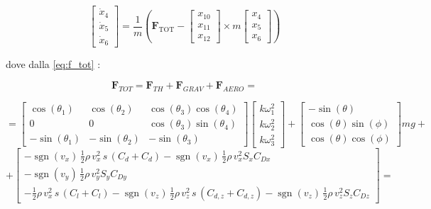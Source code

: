 \begin{equation}
\begin{bmatrix}
\dot{x}_4 \\ \dot{x}_5 \\ \dot{x}_6
\end{bmatrix}
=
\frac{1}{m}\left(
\bm{F}_{\text{TOT}} -
\begin{bmatrix}
x_{10} \\ x_{11} \\ x_{12}
\end{bmatrix}
\times
m
\begin{bmatrix}
x_4 \\ x_5 \\ x_6
\end{bmatrix}
\right)
\end{equation}



\vspace{0.5cm}

dove dalla \ref{eq:f_tot} :

\begin{equation*}
\bm{F}_{TOT} = \bm{F}_{TH} + \bm{F}_{GRAV} + \bm{F}_{AERO} = 
\end{equation*}

\begin{equation*}
=  
\begin{bmatrix}
	\cos(\theta_{1}) & \cos(\theta_{2}) & {\cos(\theta_{3})\cos(\theta_{4})} \\
	0                 & 0                 & {\cos(\theta_{3})\sin(\theta_{4})} \\
	-\sin(\theta_{1}) & -\sin(\theta_{2}) & {-\sin(\theta_{3})}
\end{bmatrix}
\begin{bmatrix}
	k\omega_{1}^2 \\
	k\omega_{2}^2 \\
	k\omega_{3}^2 
\end{bmatrix} +  \begin{bmatrix}
	-\sin(\theta) \\
	\cos(\theta)\sin(\phi) \\
	\cos(\theta)\cos(\phi) 
\end{bmatrix} m g +  
\end{equation*}
\begin{equation*}
+
\begin{bmatrix}
	  	-\operatorname{sgn}(v_x) \,\frac{1}{2}\rho\, v_x^2\, s\, (C_d + C_d) -\operatorname{sgn}(v_x) \,\frac{1}{2}\rho\, v_x^2 S_{x} C_{Dx} \\
	  	-\operatorname{sgn}(v_y)\,\frac{1}{2}\rho\, v_y^2 S_{y} C_{Dy} \\
	  	-\frac{1}{2}\rho\, v_x^2\, s\, (C_l + C_l) - \operatorname{sgn}(v_z)\,\frac{1}{2}\rho\, v_z^2\, s\, (C_{d,z} + C_{d,z}) - \operatorname{sgn}(v_z) \,\frac{1}{2}\rho\, v_z^2 S_{z} C_{Dz}
\end{bmatrix}
=
\end{equation*}

